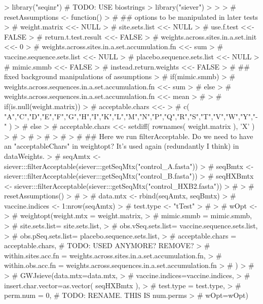 \documentclass{article}
\begin{document}
\begin{Schunk}
\begin{Sinput}
> library("seqinr") # TODO: USE biostrings
> library("siever")
> 
> 
> # resetAssumptions <- function() {
> #   ## options to be manipulated in later tests
> #   weight.matrix <<- NULL 
> #   site.sets.list <<- NULL
> #   use.f.test <<- FALSE 
> #   return.t.test.result <<- FALSE
> #   weights.across.sites.in.a.set.init <<- 0 
> #   weights.across.sites.in.a.set.accumulation.fn <<- sum
> #   vaccine.sequence.sets.list <<-  NULL
> #   placebo.sequence.sets.list <<- NULL 
> #   mimic.smmb <<-  FALSE 
> #   instead.return.weights <<- FALSE
> #   ## fixed background manipulations of assumptions
> #   if(mimic.smmb) {
> #      weights.across.sequences.in.a.set.accumulation.fn <<- sum
> #   } else {     
> #      weights.across.sequences.in.a.set.accumulation.fn <<- mean
> #   }     
> #   if(is.null(weight.matrix)) {
> #      acceptable.chars <<- 
> #         c( "A","C","D","E","F","G","H","I","K","L","M","N","P","Q","R","S","T","V","W","Y","-" )
> #   } else {
> #      acceptable.chars <<- setdiff( rownames( weight.matrix ), 'X' )
> #   }     
> #   
> # }
> # 
> # ## Here we run filterAcceptable.  Do we need to have an "acceptableChars" in weightopt?  It's used again (redundantly I think) in dataWeights.
> # seqAmtx   <- siever:::filterAcceptable(siever:::getSeqMtx("control_A.fasta"))
> # seqBmtx   <- siever:::filterAcceptable(siever:::getSeqMtx("control_B.fasta"))
> # seqHXBmtx <- siever:::filterAcceptable(siever:::getSeqMtx("control_HXB2.fasta"))
> # 
> # resetAssumptions()
> # 
> # data.mtx <- rbind(seqAmtx, seqBmtx)
> # vaccine.indices <- 1:nrow(seqAmtx)
> # test.type <- "tTest" 
> #   
> # wOpt <- 
> #    weightopt(weight.mtx = weight.matrix, 
> #              mimic.smmb = mimic.smmb, 
> #              site.sets.list= site.sets.list, 
> #              obs.vSeq.sets.list= vaccine.sequence.sets.list,
> #              obs.pSeq.sets.list= placebo.sequence.sets.list, 
> #              acceptable.chars = acceptable.chars, # TODO: USED ANYMORE?  REMOVE?
> #              within.sites.acc.fn = weights.across.sites.in.a.set.accumulation.fn,
> #              within.obs.acc.fn = weights.across.sequences.in.a.set.accumulation.fn
> #              )
> #   
> #   GWJsieve(data.mtx=data.mtx,
> #            vaccine.indices=vaccine.indices, 
> #            insert.char.vector=as.vector( seqHXBmtx ),
> #            test.type = test.type,
> #            perm.num = 0, # TODO: RENAME.  THIS IS num.perms
> #            wOpt=wOpt)
\end{Sinput}
\end{Schunk}
\end{document}
